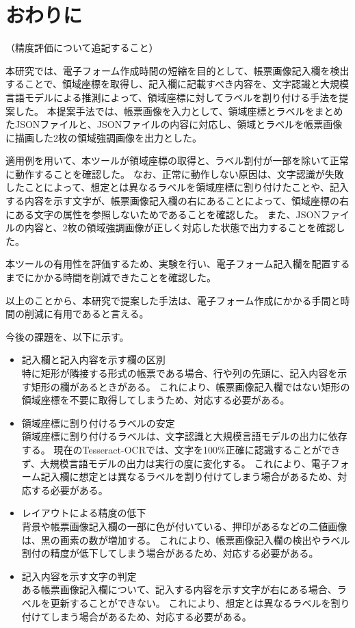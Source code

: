 \chapter{おわりに}\label{cha:Conclusion}
（精度評価について追記すること）

本研究では、電子フォーム作成時間の短縮を目的として、帳票画像記入欄を検出することで、領域座標を取得し、記入欄に記載すべき内容を、文字認識と大規模言語モデルによる推測によって、領域座標に対してラベルを割り付ける手法を提案した。
本提案手法では、帳票画像を入力として、領域座標とラベルをまとめたJSONファイルと、JSONファイルの内容に対応し、領域とラベルを帳票画像に描画した2枚の領域強調画像を出力とした。

適用例を用いて、本ツールが領域座標の取得と、ラベル割付が一部を除いて正常に動作することを確認した。
なお、正常に動作しない原因は、文字認識が失敗したことによって、想定とは異なるラベルを領域座標に割り付けたことや、記入する内容を示す文字が、帳票画像記入欄の右にあることによって、領域座標の右にある文字の属性を参照しないためであることを確認した。
また、JSONファイルの内容と、2枚の領域強調画像が正しく対応した状態で出力することを確認した。

本ツールの有用性を評価するため、実験を行い、電子フォーム記入欄を配置するまでにかかる時間を削減できたことを確認した。

以上のことから、本研究で提案した手法は、電子フォーム作成にかかる手間と時間の削減に有用であると言える。

今後の課題を、以下に示す。

\begin{itemize}
    \item 記入欄と記入内容を示す欄の区別\\
        特に矩形が隣接する形式の帳票である場合、行や列の先頭に、記入内容を示す矩形の欄があるときがある。
        これにより、帳票画像記入欄ではない矩形の領域座標を不要に取得してしまうため、対応する必要がある。
    \item 領域座標に割り付けるラベルの安定\\
        領域座標に割り付けるラベルは、文字認識と大規模言語モデルの出力に依存する。
        現在のTesseract-OCRでは、文字を100\%正確に認識することができず、大規模言語モデルの出力は実行の度に変化する。
        これにより、電子フォーム記入欄に想定とは異なるラベルを割り付けてしまう場合があるため、対応する必要がある。
    \item レイアウトによる精度の低下\\
        背景や帳票画像記入欄の一部に色が付いている、押印があるなどの二値画像は、黒の画素の数が増加する。
        これにより、帳票画像記入欄の検出やラベル割付の精度が低下してしまう場合があるため、対応する必要がある。
    \item 記入内容を示す文字の判定\\
        ある帳票画像記入欄について、記入する内容を示す文字が右にある場合、ラベルを更新することができない。
        これにより、想定とは異なるラベルを割り付けてしまう場合があるため、対応する必要がある。
\end{itemize}